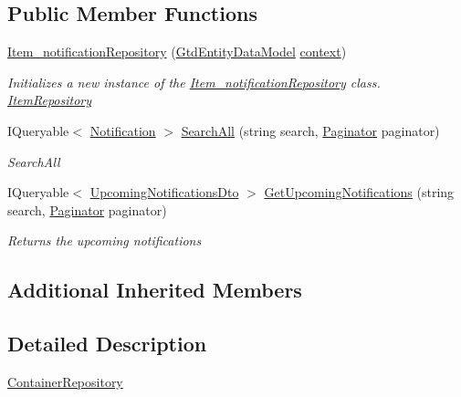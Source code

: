 \subsection*{Public Member Functions}
\begin{DoxyCompactItemize}
\item 
\mbox{\hyperlink{class_gtd_app_1_1_repository_1_1_item__notification_repository_ad17fd67c3bfedf6fb8ec81baadefc108}{Item\+\_\+notification\+Repository}} (\mbox{\hyperlink{class_gtd_app_1_1_data_1_1_gtd_entity_data_model}{Gtd\+Entity\+Data\+Model}} \mbox{\hyperlink{class_gtd_app_1_1_repository_1_1_repository_a693057a1b8acd4c3778c183440feed41}{context}})
\begin{DoxyCompactList}\small\item\em Initializes a new instance of the \mbox{\hyperlink{class_gtd_app_1_1_repository_1_1_item__notification_repository}{Item\+\_\+notification\+Repository}} class. \mbox{\hyperlink{class_gtd_app_1_1_repository_1_1_item_repository}{Item\+Repository}} \end{DoxyCompactList}\item 
I\+Queryable$<$ \mbox{\hyperlink{class_gtd_app_1_1_data_1_1_notification}{Notification}} $>$ \mbox{\hyperlink{class_gtd_app_1_1_repository_1_1_item__notification_repository_a6a06b004e4547aeb770266b856d1bd95}{Search\+All}} (string search, \mbox{\hyperlink{class_gtd_app_1_1_repository_1_1_paginator}{Paginator}} paginator)
\begin{DoxyCompactList}\small\item\em Search\+All \end{DoxyCompactList}\item 
I\+Queryable$<$ \mbox{\hyperlink{class_gtd_app_1_1_data_1_1_dto_1_1_upcoming_notifications_dto}{Upcoming\+Notifications\+Dto}} $>$ \mbox{\hyperlink{class_gtd_app_1_1_repository_1_1_item__notification_repository_ac26afe22f48577db6c569410a33a8204}{Get\+Upcoming\+Notifications}} (string search, \mbox{\hyperlink{class_gtd_app_1_1_repository_1_1_paginator}{Paginator}} paginator)
\begin{DoxyCompactList}\small\item\em Returns the upcoming notifications \end{DoxyCompactList}\end{DoxyCompactItemize}
\subsection*{Additional Inherited Members}


\subsection{Detailed Description}
\mbox{\hyperlink{class_gtd_app_1_1_repository_1_1_container_repository}{Container\+Repository}} 



